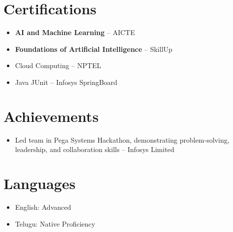 \documentclass[11pt]{article}
\begin{document}
\section*{Certifications}
\begin{itemize}[leftmargin=*,label=\textbullet]
    \item \textbf{AI and Machine Learning} – AICTE
    \item \textbf{Foundations of Artificial Intelligence} – SkillUp
    \item Cloud Computing – NPTEL
    \item Java JUnit – Infosys SpringBoard
\end{itemize}

\section*{Achievements}
\begin{itemize}[leftmargin=*,label=\textbullet]
    \item Led team in Pega Systems Hackathon, demonstrating problem-solving, leadership, and collaboration skills – Infosys Limited
\end{itemize}

\section*{Languages}
\begin{itemize}[leftmargin=*,label=\textbullet]
    \item English: Advanced
    \item Telugu: Native Proficiency
\end{itemize}
\end{document}
